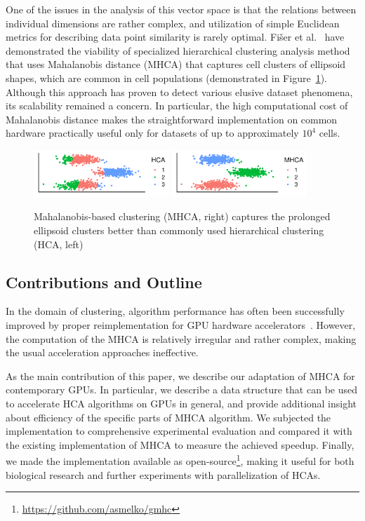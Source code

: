 One of the issues in the analysis of this vector space is that the relations between individual dimensions are rather complex, and utilization of simple Euclidean metrics for describing data point similarity is rarely optimal.
Fišer et al.~\cite{fivser2012detection} have demonstrated the viability of specialized hierarchical clustering analysis method that uses Mahalanobis distance (MHCA) that captures cell clusters of ellipsoid shapes, which are common in cell populations (demonstrated in Figure~\ref{fig:mahaclust}).
Although this approach has proven to detect various elusive dataset phenomena, its scalability remained a concern.
In particular, the high computational cost of Mahalanobis distance makes the straightforward implementation on common hardware practically useful only for datasets of up to approximately $10^4$ cells.

\begin{figure}[t]
	\centering
	\includegraphics[width=2in]{Mahalanobis/img/hca.pdf}\quad%
	\includegraphics[width=2in]{Mahalanobis/img/mhca.pdf}
	\caption{Mahalanobis-based clustering (MHCA, right) captures the prolonged ellipsoid clusters better than commonly used hierarchical clustering (HCA, left)}
	\label{fig:mahaclust}
\end{figure}

\subsection{Contributions and Outline}

In the domain of clustering, algorithm performance has often been successfully improved by proper reimplementation for GPU hardware accelerators~\cite{krulivs2020detailed,gowanlock2017clustering,cuomo2019gpu}.
However, the computation of the MHCA is relatively irregular and rather complex, making the usual acceleration approaches ineffective.

As the main contribution of this paper, we describe our adaptation of MHCA for contemporary GPUs.
In particular, we describe a data structure that can be used to accelerate HCA algorithms on GPUs in general, and provide additional insight about efficiency of the specific parts of MHCA algorithm.
We subjected the implementation to comprehensive experimental evaluation and compared it with the existing implementation of MHCA to measure the achieved speedup.
Finally, we made the implementation available as open-source\footnote{\url{https://github.com/asmelko/gmhc}}, making it useful for both biological research and further experiments with parallelization of HCAs.

